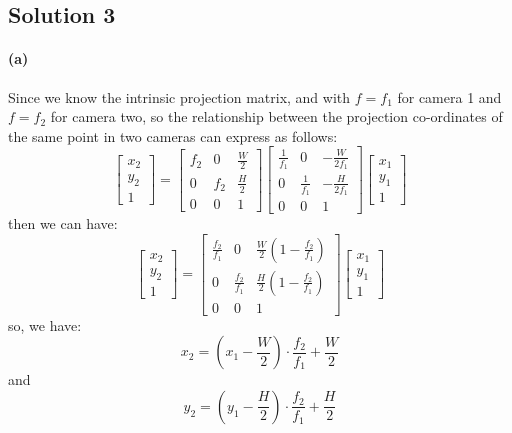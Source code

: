 \documentclass{article}
\newcommand{\solution}[1]{\clearpage \subsection*{Solution #1}}
\newcommand{\spart}[1]{\paragraph{(#1)}}
\begin{document}
\solution{3}
\spart{a}Since we know the intrinsic projection matrix, and with $f = f_1$ for camera 1 and $f = f_2$ for camera two, so the relationship between the projection co-ordinates of the same point in two cameras can express as follows:
\begin{equation}
 \left[
      \begin{array}{c}
      x_2 \\ y_2 \\ 1
      \end{array}
 \right]
 =
 \left[
     \begin{array}{ccc}
     f_2 & 0 & \frac{W}{2}\\
     0 & f_2 & \frac{H}{2}\\
     0 & 0 & 1
     \end{array}
 \right]
 \left[
    \begin{array}{ccc}
    \frac{1}{f_1} & 0 & -\frac{W}{2f_1}\\
    0 & \frac{1}{f_1} & -\frac{H}{2f_1}\\
    0 & 0 & 1
    \end{array}
 \right]
 \left[
    \begin{array}{c}
    x_1\\y_1\\1
    \end{array}
 \right]
\end{equation}
then we can have:
\begin{equation}
 \left[
   \begin{array}{c}
      x_2\\y_2\\1
   \end{array}
 \right]
 =
 \left[
   \begin{array}{ccc}
      \frac{f_2}{f_1} & 0 & \frac{W}{2}(1- \frac{f_2}{f_1})\\
      0 & \frac{f_2}{f_1} & \frac{H}{2}(1-\frac{f_2}{f_1})\\
      0 & 0 & 1
   \end{array}
 \right]
 \left[
   \begin{array}{c}
     x_1\\y_1\\1
   \end{array}
 \right]
\end{equation}
so, we have:
$$
x_2 = (x_1 - \frac{W}{2})\cdot \frac{f_2}{f_1} + \frac{W}{2}
$$
and
$$
y_2 = (y_1 - \frac{H}{2})\cdot \frac{f_2}{f_1} + \frac{H}{2}
$$
\end{document}
